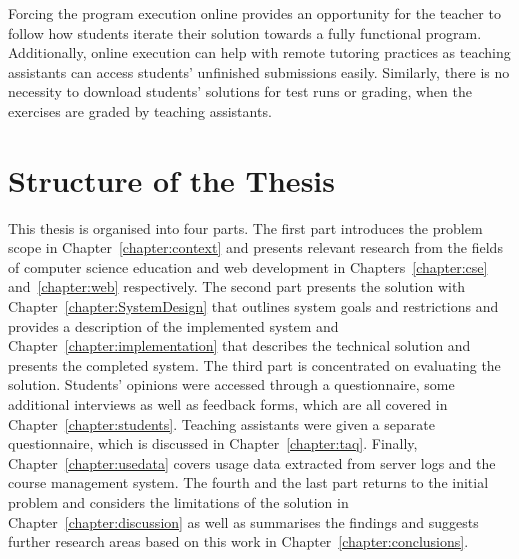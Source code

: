 Forcing the program execution online provides an opportunity for the teacher to follow how students iterate their solution towards a fully functional program. Additionally, online execution can help with remote tutoring practices as teaching assistants can access students' unfinished submissions easily. Similarly, there is no necessity to download students' solutions for test runs or grading, when the exercises are graded by teaching assistants.


\section{Structure of the Thesis}
\label{section:structure} 

This thesis is organised into four parts. The first part introduces the problem scope in Chapter~\ref{chapter:context} and presents relevant research from the fields of computer science education and web development in Chapters~\ref{chapter:cse} and~\ref{chapter:web} respectively. The second part presents the solution with Chapter~\ref{chapter:SystemDesign} that outlines system goals and restrictions and provides a description of the implemented system and Chapter~\ref{chapter:implementation} that describes the technical solution and presents the completed system. The third part is concentrated on evaluating the solution. Students' opinions were accessed through a questionnaire, some additional interviews as well as feedback forms, which are all covered in Chapter~\ref{chapter:students}. Teaching assistants were given a separate questionnaire, which is discussed in Chapter~\ref{chapter:taq}. Finally, Chapter~\ref{chapter:usedata} covers usage data extracted from server logs and the course management system. The fourth and the last part returns to the initial problem and considers the limitations of the solution in Chapter~\ref{chapter:discussion} as well as summarises the findings and suggests further research areas based on this work in Chapter~\ref{chapter:conclusions}.
